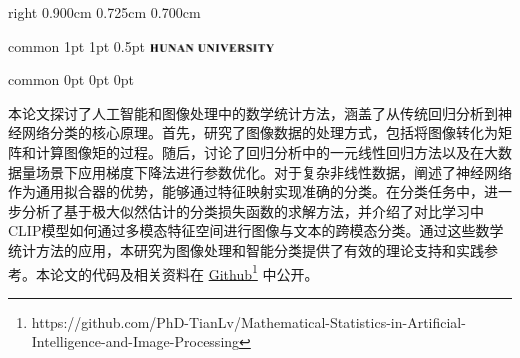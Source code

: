 \documentclass[
    report,     %
    oneside,    %
    UTF8,       %
    zihao=-4    %
]{config} %
\begin{document}
\CoverPage
    {right} %
    {0.900cm} %
    {0.725cm} %
    {0.700cm} %


\Header
    {common} %
    {1pt} %
    {1pt} %
    {0.5pt} %
    {} %
    {\includegraphics[width=0.25\textwidth]{figures/logos/HNU-title-EN.png}} %
    {} %


\Footer
    {common} %
    {0pt} %
    {0pt} %
    {0pt} %
    {} %
    {\thepage} %
    {} %


\SetRomanPageNumber{} %


\begin{abstractCN}[0.6cm] %

本论文探讨了人工智能和图像处理中的数学统计方法，涵盖了从传统回归分析到神经网络分类的核心原理。首先，研究了图像数据的处理方式，包括将图像转化为矩阵和计算图像矩的过程。随后，讨论了回归分析中的一元线性回归方法以及在大数据量场景下应用梯度下降法进行参数优化。对于复杂非线性数据，阐述了神经网络作为通用拟合器的优势，能够通过特征映射实现准确的分类。在分类任务中，进一步分析了基于极大似然估计的分类损失函数的求解方法，并介绍了对比学习中CLIP模型如何通过多模态特征空间进行图像与文本的跨模态分类。通过这些数学统计方法的应用，本研究为图像处理和智能分类提供了有效的理论支持和实践参考。本论文的代码及相关资料在 \href{https://github.com/PhD-TianLv/Mathematical-Statistics-in-Artificial-Intelligence-and-Image-Processing}{Github}\footnote{https://github.com/PhD-TianLv/Mathematical-Statistics-in-Artificial-Intelligence-and-Image-Processing} 中公开。


\def\keywordsCN{人工智能；图像处理；数学统计；神经网络}

\end{abstractCN}
\end{document}
